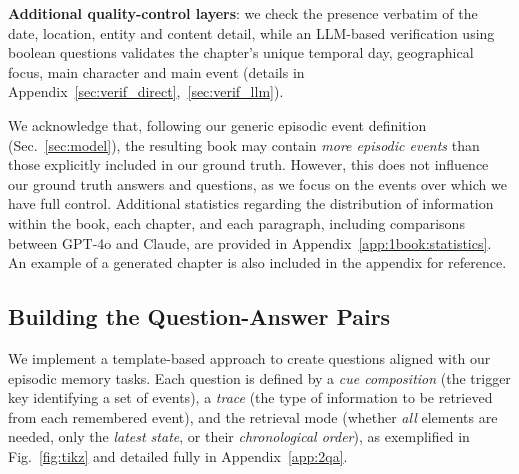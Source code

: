 \documentclass{article}
\newcommand{\AH}[1]{\textcolor{cyan}{#1}}
\begin{document}
\textbf{Additional quality-control layers}: we check the presence verbatim of the date, location, entity and content detail, while an LLM-based verification using boolean questions validates the chapter's unique temporal day, geographical focus, main character and main event (details in Appendix~\ref{sec:verif_direct},~\ref{sec:verif_llm}). 

We acknowledge that, following our generic episodic event definition (Sec.~\ref{sec:model}), the resulting book may contain \textit{more episodic events} than those explicitly included in our ground truth. However, this does not influence our ground truth answers and questions, as we focus on the events over which we have full control. Additional statistics regarding the distribution of information within the book, each chapter, and each paragraph, including comparisons between GPT-4o and Claude, are provided in Appendix~\ref{app:1book:statistics}. An example of a generated chapter is also included in the appendix for reference.

\subsection{Building the Question-Answer Pairs}

We implement a template-based approach to create questions aligned with our episodic memory tasks. Each question is defined by a \emph{cue composition} (the trigger key identifying a set of events), a \emph{trace} (the type of information to be retrieved from each remembered event), and the retrieval mode (whether \textit{all} elements are needed, only the \textit{latest state}, or their \textit{chronological order}), as exemplified in Fig.~\ref{fig:tikz} and detailed fully in Appendix~\ref{app:2qa}.
\end{document}

